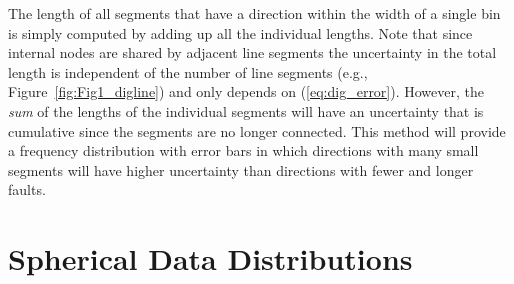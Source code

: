 	The length of all segments that have a direction within the width of a single bin is simply computed by adding
up all the individual lengths.  Note that since internal nodes are shared by adjacent line segments the uncertainty
in the total length is independent of the number of line segments (e.g., Figure~\ref{fig:Fig1_digline}) and only depends on (\ref{eq:dig_error}).  However,
the \emph{sum} of the lengths of the individual segments will have an uncertainty that is cumulative since the segments are no longer connected.
This method will provide a frequency distribution with error bars in which directions with many small segments will have higher 
uncertainty than directions with fewer and longer faults.

\section{Spherical Data Distributions}

